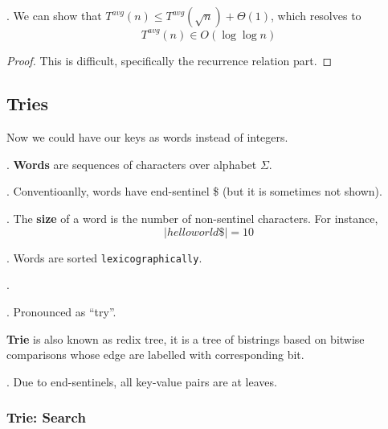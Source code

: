 \documentclass{article}
\begin{document}
\begin{thmm}[].
    We can show that $T^{avg}(n) \leq T^{avg}(\sqrt{n}) + \Theta(1)$, which resolves to 
    \[ T^{avg}(n) \in O(\log \log n) \]
\end{thmm}

\begin{proof}
    This is difficult, specifically the recurrence relation part. 
\end{proof}

\subsection{Tries}  

Now we could have our keys as words instead of integers. 

\begin{deff}.
    \textbf{Words} are sequences of characters over alphabet $\Sigma$. 
\end{deff}

\begin{codes}[].
    Conventioanlly, words have end-sentinel \$ (but it is sometimes not shown). 
\end{codes}

\begin{deff}.
    The \textbf{size} of a word is the number of non-sentinel characters. 
    For instance, 
    \[ | helloworld\$ | = 10 \]
\end{deff}

\begin{comm}[].
    Words are sorted \texttt{lexicographically}. 
\end{comm}

\begin{deff}.
    \begin{comm}[].
        Pronounced as ``try''. 
    \end{comm}
    \textbf{Trie} is also known as redix tree, it is a tree of bistrings based on bitwise comparisons whose edge are labelled with corresponding bit. 
\end{deff}

\begin{discovery}[].
    Due to end-sentinels, all key-value pairs are at leaves. 
\end{discovery}

\subsubsection{Trie: Search} 
\end{document}

